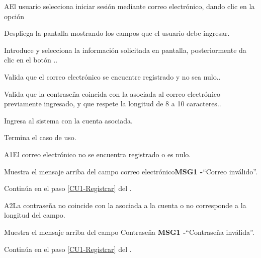 		\begin{UCtrayectoriaA}{A}{El usuario selecciona iniciar sesión mediante correo electrónico, dando clic en la opción }
			
			\UCpaso Despliega la pantalla  mostrando los campos que el usuario debe ingresar.
			
			\UCpaso[\UCactor] Introduce y selecciona la información solicitada en pantalla, posteriormente da clic en el botón .\label{CU1-iniciar}.
			
			\UCpaso Valida que el correo electrónico se encuentre registrado y no sea nulo..

			\UCpaso Valida que la contraseña coincida con la asociada al correo electrónico previamente ingresado, y que respete la longitud de 8 a 10 caracteres..
			
			\UCpaso Ingresa al sistema con la cuenta asociada.
			
			\UCpaso[] Termina el caso de uso.
			
		\end{UCtrayectoriaA}
	
		\begin{UCtrayectoriaA}{A1}{El correo electrónico no se encuentra registrado o es nulo.}
		
		\UCpaso Muestra el mensaje arriba del campo correo electrónico{\bf MSG1 -}``Correo  inválido''.
		
		\UCpaso Continúa en el paso \ref{CU1-Registrar} del .
		
	\end{UCtrayectoriaA}

		\begin{UCtrayectoriaA}{A2}{La contraseña no coincide con la asociada a la cuenta o no corresponde a la longitud del campo.}
		
		\UCpaso Muestra el mensaje arriba del campo Contraseña {\bf MSG1 -}``Contraseña inválida''.
		
		\UCpaso Continúa en el paso \ref{CU1-Registrar} del .
		
	\end{UCtrayectoriaA}
		
